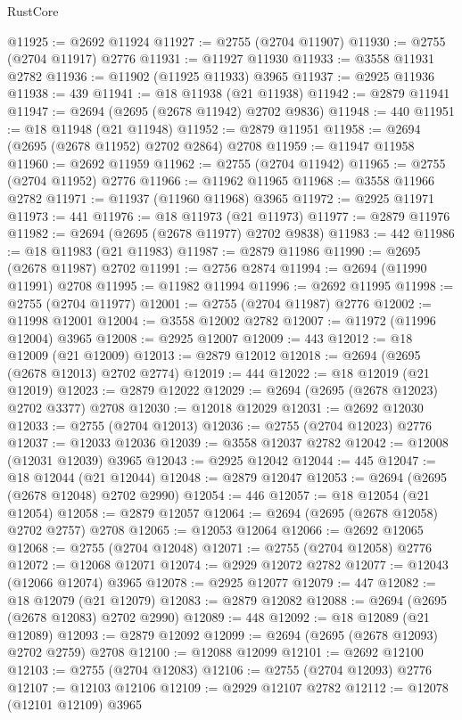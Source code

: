 \begin{lexlean}{RustCore}
\begin{coremodule}
@11925 := @2692 @11924
@11927 := @2755 (@2704 @11907)
@11930 := @2755 (@2704 @11917) @2776
@11931 := @11927 @11930
@11933 := @3558 @11931 @2782
@11936 := @11902 (@11925 @11933) @3965
@11937 := @2925 @11936
@11938 := 439
@11941 := @18 @11938 (@21 @11938)
@11942 := @2879 @11941
@11947 := @2694 (@2695 (@2678 @11942) @2702 @9836)
@11948 := 440
@11951 := @18 @11948 (@21 @11948)
@11952 := @2879 @11951
@11958 := @2694 (@2695 (@2678 @11952) @2702 @2864) @2708
@11959 := @11947 @11958
@11960 := @2692 @11959
@11962 := @2755 (@2704 @11942)
@11965 := @2755 (@2704 @11952) @2776
@11966 := @11962 @11965
@11968 := @3558 @11966 @2782
@11971 := @11937 (@11960 @11968) @3965
@11972 := @2925 @11971
@11973 := 441
@11976 := @18 @11973 (@21 @11973)
@11977 := @2879 @11976
@11982 := @2694 (@2695 (@2678 @11977) @2702 @9838)
@11983 := 442
@11986 := @18 @11983 (@21 @11983)
@11987 := @2879 @11986
@11990 := @2695 (@2678 @11987) @2702
@11991 := @2756 @2874
@11994 := @2694 (@11990 @11991) @2708
@11995 := @11982 @11994
@11996 := @2692 @11995
@11998 := @2755 (@2704 @11977)
@12001 := @2755 (@2704 @11987) @2776
@12002 := @11998 @12001
@12004 := @3558 @12002 @2782
@12007 := @11972 (@11996 @12004) @3965
@12008 := @2925 @12007
@12009 := 443
@12012 := @18 @12009 (@21 @12009)
@12013 := @2879 @12012
@12018 := @2694 (@2695 (@2678 @12013) @2702 @2774)
@12019 := 444
@12022 := @18 @12019 (@21 @12019)
@12023 := @2879 @12022
@12029 := @2694 (@2695 (@2678 @12023) @2702 @3377) @2708
@12030 := @12018 @12029
@12031 := @2692 @12030
@12033 := @2755 (@2704 @12013)
@12036 := @2755 (@2704 @12023) @2776
@12037 := @12033 @12036
@12039 := @3558 @12037 @2782
@12042 := @12008 (@12031 @12039) @3965
@12043 := @2925 @12042
@12044 := 445
@12047 := @18 @12044 (@21 @12044)
@12048 := @2879 @12047
@12053 := @2694 (@2695 (@2678 @12048) @2702 @2990)
@12054 := 446
@12057 := @18 @12054 (@21 @12054)
@12058 := @2879 @12057
@12064 := @2694 (@2695 (@2678 @12058) @2702 @2757) @2708
@12065 := @12053 @12064
@12066 := @2692 @12065
@12068 := @2755 (@2704 @12048)
@12071 := @2755 (@2704 @12058) @2776
@12072 := @12068 @12071
@12074 := @2929 @12072 @2782
@12077 := @12043 (@12066 @12074) @3965
@12078 := @2925 @12077
@12079 := 447
@12082 := @18 @12079 (@21 @12079)
@12083 := @2879 @12082
@12088 := @2694 (@2695 (@2678 @12083) @2702 @2990)
@12089 := 448
@12092 := @18 @12089 (@21 @12089)
@12093 := @2879 @12092
@12099 := @2694 (@2695 (@2678 @12093) @2702 @2759) @2708
@12100 := @12088 @12099
@12101 := @2692 @12100
@12103 := @2755 (@2704 @12083)
@12106 := @2755 (@2704 @12093) @2776
@12107 := @12103 @12106
@12109 := @2929 @12107 @2782
@12112 := @12078 (@12101 @12109) @3965

\end{coremodule}
\end{lexlean}
